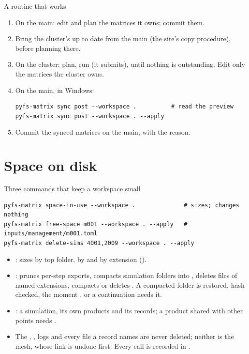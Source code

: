 \begin{frame}[fragile]{A routine that works}
\begin{enumerate}\small
  \item On the main: edit and plan the matrices it owns; commit them.
  \item Bring the cluster's  up to date from the main (the
        site's copy procedure), before planning there.
  \item On the cluster: plan, run (it submits),  until
        nothing is outstanding. Edit only the matrices the cluster owns.
  \item On the main, in Windows:
\begin{lstlisting}[style=ftsbase]
pyfs-matrix sync post --workspace .          # read the preview
pyfs-matrix sync post --workspace . --apply
\end{lstlisting}
  \item Commit the synced matrices on the main, with the reason.
\end{enumerate}
\end{frame}

\section{Space on disk}
\label{sec:storage}

\begin{frame}[fragile]{Three commands that keep a workspace small}
\begin{lstlisting}[style=ftsbase]
pyfs-matrix space-in-use --workspace .              # sizes; changes nothing
pyfs-matrix free-space m001 --workspace . --apply   # inputs/management/m001.toml
pyfs-matrix delete-sims 4001,2009 --workspace . --apply
\end{lstlisting}
\begin{itemize}\small
  \item {}: sizes by top folder, by  and by
        extension ().
  \item {}: prunes per-step exports, compacts simulation folders into
        , deletes files of named extensions, compacts
        or deletes . A compacted folder is
        restored, hash checked, the moment ,  or a
        continuation needs it.
  \item {}: a simulation, its own products and its records;
        a product shared with other points needs .
  \item The , , logs and every file a record names
        are never deleted; neither is the mesh, whose link is undone first.
        Every call is recorded in .
\end{itemize}
\end{frame}

